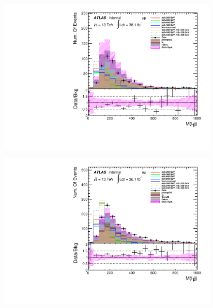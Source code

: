 \begin{figure}[h]
\begin{minipage}[t]{0.33\linewidth}
 \includegraphics[width=1.0\textwidth,angle=-90]{fig/dataMC_low_Njet_CR/m_l1jj_mumu.pdf}\label{fig:dataMC_low_Njet_CR:m_l1jj_mumu.pdf}
 \end{minipage}
 \begin{minipage}[t]{0.33\linewidth}
 \centering
 \includegraphics[width=1.0\textwidth,angle=-90]{fig/dataMC_low_Njet_CR/m_l1jj_emu.pdf}\label{fig:dataMC_low_Njet_CR:m_l1jj_emu.pdf}
 \end{minipage}
 \begin{minipage}[t]{0.33\linewidth}
 \centering

\end{minipage}
\end{figure}
